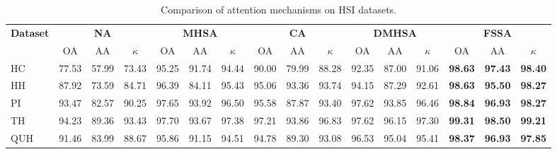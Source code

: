 \begin{table}[h]
\caption{Comparison of attention mechanisms on HSI datasets.}
\centering
\begin{adjustbox}{max width=\linewidth}
\begin{tabular}{|l|ccc|ccc|ccc|ccc|ccc|}
\hline
\multirow{2}{*}{\textbf{Dataset}}
& \multicolumn{3}{c|}{\textbf{NA}}
& \multicolumn{3}{c|}{\textbf{MHSA}}
& \multicolumn{3}{c|}{\textbf{CA}}
& \multicolumn{3}{c|}{\textbf{DMHSA}}
& \multicolumn{3}{c|}{\textbf{FSSA}} \\ \cline{2-16}

& OA & AA & $\kappa$
& OA & AA & $\kappa$
& OA & AA & $\kappa$
& OA & AA & $\kappa$
& OA & AA & $\kappa$ \\
\hline

HC
& 77.53 & 57.99 & 73.43
& 95.25 & 91.74 & 94.44
& 90.00 & 79.99 & 88.28
& 92.35 & 87.00 & 91.06
& \textbf{98.63} & \textbf{97.43} & \textbf{98.40} \\ \hline

HH
& 87.92 & 73.59 & 84.71
& 96.39 & 84.11 & 95.43
& 95.06 & 93.36 & 93.74
& 94.15 & 87.29 & 92.61
& \textbf{98.63} & \textbf{95.50} & \textbf{98.27} \\ \hline

PI
& 93.47 & 82.57 & 90.25
& 97.65 & 93.92 & 96.50
& 95.58 & 87.87 & 93.40
& 97.62 & 93.85 & 96.46
& \textbf{98.84} & \textbf{96.93} & \textbf{98.27} \\ \hline

TH
& 94.23 & 89.36 & 93.43
& 97.70 & 93.67 & 97.38
& 97.21 & 93.86 & 96.83
& 97.62 & 96.15 & 97.30
& \textbf{99.31} & \textbf{98.50} & \textbf{99.21} \\ \hline

QUH
& 91.46 & 83.99 & 88.67
& 95.86 & 91.15 & 94.51
& 94.78 & 89.30 & 93.08
& 96.53 & 95.04 & 95.41
& \textbf{98.37} & \textbf{96.93} & \textbf{97.85} \\ \hline

\end{tabular}
\end{adjustbox}

\label{tab:attention_comparison}
\end{table}














